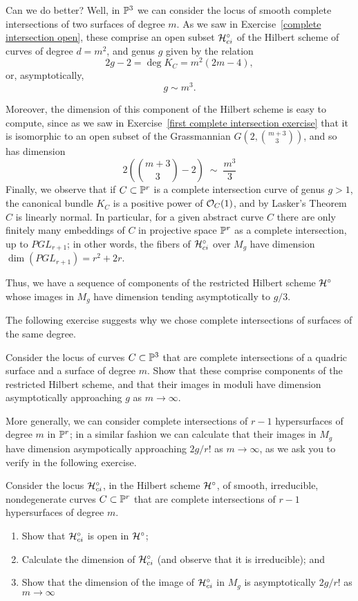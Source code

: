 Can we do better?  Well, in $\PP^3$ we can consider the locus of smooth complete intersections of two surfaces of degree $m$. As we saw in Exercise~\ref{complete intersection open}, these comprise an open subset $\cH^\circ_{ci}$ of the Hilbert scheme of curves of degree $d = m^2$, and genus $g$ given by the relation
$$
2g-2 = \deg K_C = m^2(2m-4),
$$
or, asymptotically,
$$
g \sim m^3.
$$

Moreover, the dimension of this component of the Hilbert scheme is easy to compute, since as we saw in Exercise~\ref{first complete intersection exercise} that it is isomorphic to an open subset of the Grassmannian $G(2, \binom{m+3}{3})$, and so has dimension
$$
2(\binom{m+3}{3} - 2) \; \sim \; \frac{m^3}{3}
$$
Finally, we observe that if $C \subset \PP^r$ is a complete intersection curve of genus $g >1$, the canonical bundle $K_C$ is a positive power of $\cO_C(1)$, and by Lasker's Theorem $C$ is linearly normal. In particular, for a given abstract curve $C$ there are only finitely many embeddings of $C$ in projective space $\PP^r$ as a complete intersection, up to $PGL_{r+1}$; in other words, the fibers of $\cH^\circ_{ci}$ over $M_g$ have dimension $\dim(PGL_{r+1}) = r^2 + 2r$. 

Thus, we have a sequence of components of the restricted Hilbert scheme $\cH^\circ$ whose images in $M_g$ have dimension tending asymptotically to $g/3$.

The following exercise  suggests why we chose complete intersections of surfaces of the same degree.

\begin{exercise}
Consider the locus of curves $C \subset \PP^3$ that are complete intersections of a quadric surface and a surface of degree $m$. Show that these comprise components of the restricted Hilbert scheme, and that their images in moduli have dimension asymptotically approaching $g$ as $m \to \infty$.
\end{exercise}

More generally, we can consider complete intersections of $r-1$ hypersurfaces of degree $m$ in $\PP^r$; in a similar fashion we can calculate that their images in $M_g$ have dimension asympotically approaching $2g/r!$ as $m \to \infty$, as we ask you to verify in the following exercise.

\begin{exercise}
Consider the locus $\cH^\circ_{ci}$, in the Hilbert scheme $\cH^\circ$, of smooth, irreducible, nondegenerate curves $C \subset \PP^r$ that are complete intersections of $r-1$ hypersurfaces of degree $m$. 
\begin{enumerate}
\item Show that $\cH^\circ_{ci}$ is open in $\cH^\circ$;
\item Calculate the dimension of $\cH^\circ_{ci}$ (and observe that it is irreducible); and
\item Show that the dimension of the image of $\cH^\circ_{ci}$ in $M_g$ is asymptotically $2g/r!$ as $m \to \infty$
\end{enumerate}
\end{exercise}


